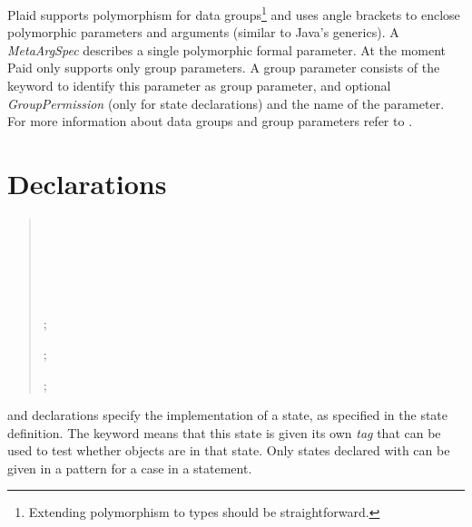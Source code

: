 Plaid supports polymorphism for data groups\footnote{Extending
  polymorphism to types should be straightforward.} and uses angle
brackets to enclose polymorphic parameters and arguments (similar to
Java's generics). A \emph{MetaArgSpec} describes a single
 polymorphic formal parameter. At the moment Paid only supports only
group parameters. A group parameter consists of the 
keyword  to identify this parameter as group parameter, and optional
\emph{GroupPermission} (only for state declarations) and the
name of the parameter. For more information about data groups and
group parameters refer to \cite{stork09:concurrency_by_default,
  stork10:uaeminium_spec}.

\section{Declarations}

\begin{quote}

 {}     \\
          \indent~~~~~~~~~~~~~~~~~~~
          	 \opt{;}

  {}     \\
           \indent~~~~~~~~~~~~~~~~~~~ \opt{;}

 {}  ;

 {}  

 {}  ;

 {}  ;




\end{quote}

 and  declarations specify the implementation of a state,
as specified in the state definition. The  keyword means that this state is given its
own \textit{tag} that can be used to test whether objects are in that state.  Only states declared with  can be given in a pattern for a case in a  statement.

